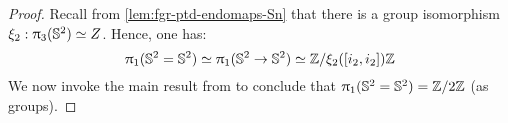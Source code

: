 \documentclass[english,a4paper]{lmcs}
\begin{document}
\begin{proof}
  Recall from \cref{lem:fgr-ptd-endomaps-Sn} that there is a group isomorphism
  $\xi_2: \uppi_{3} ({{\mathbb S^{2}}}) \simeq Z$. Hence, one has:
  \begin{equation}
    \uppi_{1} ({{\mathbb S^{2}}} = {{\mathbb S^{2}}}) \simeq \uppi_{1} ({{\mathbb S^{2}}} \to {{\mathbb S^{2}}}) \simeq \mathbb{Z} / \xi_2([i_2,i_2])\mathbb{Z}
    \label{eq:fgr-SpeqSp-ZovernZ}
  \end{equation}
  We now invoke the main result from \cite{brunerie:thesis} to conclude that
  $\uppi_{1} ({{\mathbb S^{2}}} = {{\mathbb S^{2}}}) = \mathbb{Z}/2\mathbb{Z}$ (as groups).

\end{proof}
\end{document}
